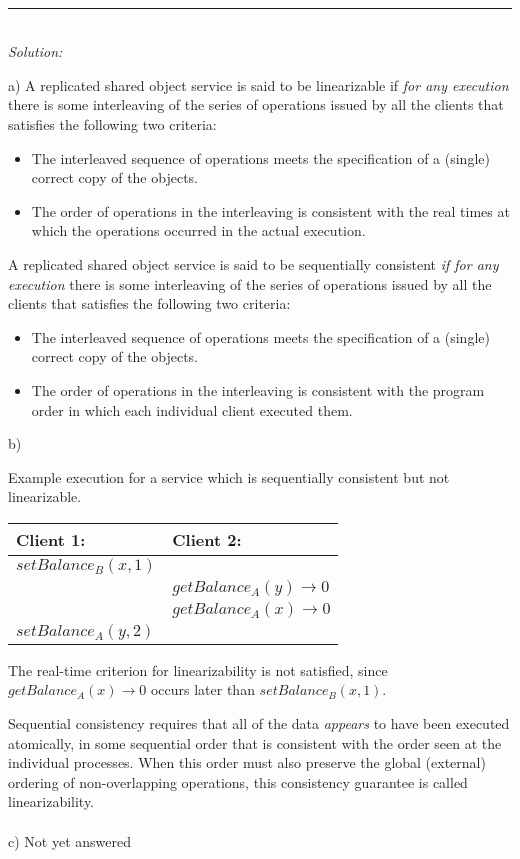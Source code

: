 \documentclass[a4paper]{article}
\newcommand{\horrule}[1]{\rule{\linewidth}{#1}} %
\newcommand{\solution}[1]{\\\horrule{0.5pt}\\[3pt]\textit{Solution: }\\[0.1cm]\begin{minipage}{\textwidth}#1\end{minipage}}
\newcommand{\highlight}[1]{{\color{blue}#1}}
\begin{document}
\solution{
  a) A replicated shared object service is said to be
  \highlight{linearizable} if \textit{for any execution} there is
  some interleaving of the series of operations issued by all the
  clients that satisfies the following two criteria:
  \begin{itemize}
    \item The interleaved sequence of operations meets the
      specification of a (single) correct copy of the objects.
    \item The order of operations in the interleaving is consistent
      with the \highlight{real times at which the operations
        occurred in the actual execution.}
  \end{itemize}

  A replicated shared object service is said to be
  \highlight{sequentially consistent} \textit{if for any
    execution} there is some interleaving of the series of operations
  issued by all the clients that satisfies the following two criteria:
  \begin{itemize}
    \item The interleaved sequence of operations meets the
      specification of a (single) correct copy of the objects.
    \item The order of operations in the interleaving is consistent
      with the \highlight{program order in which each individual
        client executed them.}
  \end{itemize}

  b) \begin{center}
    Example execution for a service which is sequentially consistent
    but not linearizable.\\
    \begin{tabular}{| l | l |}\hline
      Client 1: & Client 2: \\\hline
      $setBalance_B(x, 1)$ &\\
      & $getBalance_A(y) \rightarrow 0$\\
      & $getBalance_A(x) \rightarrow 0$\\
      $setBalance_A(y, 2)$ &\\\hline
    \end{tabular}
    The real-time criterion for linearizability is not satisfied,
    since $getBalance_A(x) \rightarrow 0$ occurs later than
    $setBalance_B(x,1)$.\\
  \end{center}

  Sequential consistency requires that all of the data
  \textit{appears} to have been executed atomically, in some sequential
  order that is consistent with the order seen at the individual
  processes. When this order must also preserve the global (external)
  ordering of non-overlapping operations, this consistency guarantee is
  called linearizability.\\ \\
  c) Not yet answered
}
\end{document}
